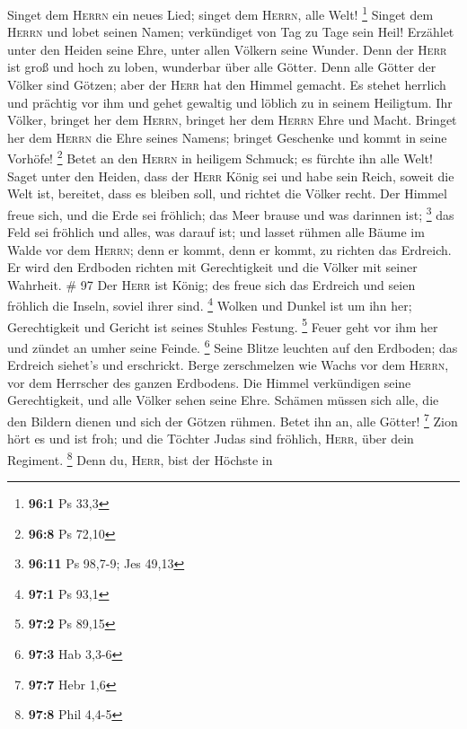  Singet dem \textsc{Herrn} ein neues Lied; singet dem
\textsc{Herrn}, alle Welt! \footnote{\textbf{96:1} Ps 33,3}
 Singet dem \textsc{Herrn} und lobet seinen Namen;
verkündiget von Tag zu Tage sein Heil!  Erzählet unter den
Heiden seine Ehre, unter allen Völkern seine Wunder.  Denn
der \textsc{Herr} ist groß und hoch zu loben, wunderbar über alle
Götter.  Denn alle Götter der Völker sind Götzen; aber der
\textsc{Herr} hat den Himmel gemacht.  Es stehet herrlich
und prächtig vor ihm und gehet gewaltig und löblich zu in seinem
Heiligtum.  Ihr Völker, bringet her dem \textsc{Herrn},
bringet her dem \textsc{Herrn} Ehre und Macht.  Bringet
her dem \textsc{Herrn} die Ehre seines Namens; bringet Geschenke und
kommt in seine Vorhöfe! \footnote{\textbf{96:8} Ps 72,10} 
Betet an den \textsc{Herrn} in heiligem Schmuck; es fürchte ihn alle
Welt!  Saget unter den Heiden, dass der \textsc{Herr}
König sei und habe sein Reich, soweit die Welt ist, bereitet, dass es
bleiben soll, und richtet die Völker recht.  Der Himmel
freue sich, und die Erde sei fröhlich; das Meer brause und was darinnen
ist; \footnote{\textbf{96:11} Ps 98,7-9; Jes 49,13}  das
Feld sei fröhlich und alles, was darauf ist; und lasset rühmen alle
Bäume im Walde  vor dem \textsc{Herrn}; denn er kommt,
denn er kommt, zu richten das Erdreich. Er wird den Erdboden richten mit
Gerechtigkeit und die Völker mit seiner Wahrheit. \# 97 
Der \textsc{Herr} ist König; des freue sich das Erdreich und seien
fröhlich die Inseln, soviel ihrer sind. \footnote{\textbf{97:1} Ps 93,1}
 Wolken und Dunkel ist um ihn her; Gerechtigkeit und
Gericht ist seines Stuhles Festung. \footnote{\textbf{97:2} Ps 89,15}
 Feuer geht vor ihm her und zündet an umher seine Feinde.
\footnote{\textbf{97:3} Hab 3,3-6}  Seine Blitze leuchten
auf den Erdboden; das Erdreich siehet's und erschrickt. 
Berge zerschmelzen wie Wachs vor dem \textsc{Herrn}, vor dem Herrscher
des ganzen Erdbodens.  Die Himmel verkündigen seine
Gerechtigkeit, und alle Völker sehen seine Ehre.  Schämen
müssen sich alle, die den Bildern dienen und sich der Götzen rühmen.
Betet ihn an, alle Götter! \footnote{\textbf{97:7} Hebr 1,6}
 Zion hört es und ist froh; und die Töchter Judas sind
fröhlich, \textsc{Herr}, über dein Regiment. \footnote{\textbf{97:8}
  Phil 4,4-5}  Denn du, \textsc{Herr}, bist der Höchste in
